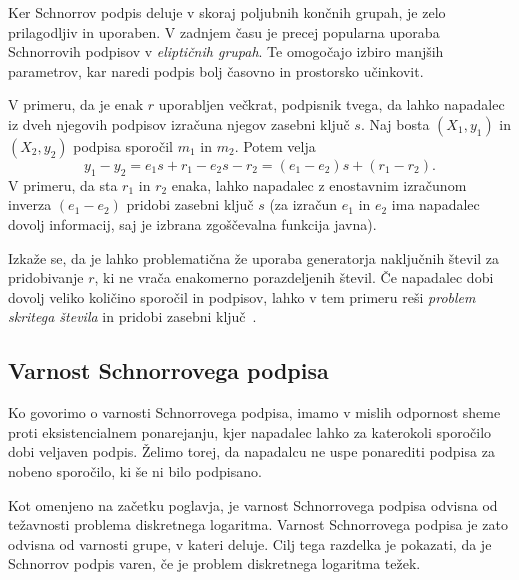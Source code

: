 Ker Schnorrov podpis deluje v skoraj poljubnih končnih grupah, je zelo prilagodljiv in uporaben.
V zadnjem času je precej popularna uporaba Schnorrovih podpisov v \textit{eliptičnih grupah}.
Te omogočajo izbiro manjših parametrov, kar naredi podpis bolj časovno in prostorsko učinkovit.

\begin{opomba}
\label{opomba:nonce}
    V primeru, da je enak $r$ uporabljen večkrat, podpisnik tvega, da lahko napadalec iz dveh njegovih
    podpisov izračuna njegov zasebni ključ $s$. Naj bosta $(X_1, y_1)$ in $(X_2, y_2)$ podpisa sporočil
    $m_1$ in $m_2$. Potem velja
    $$
    y_1 - y_2 = e_1 s + r_1 - e_2 s - r_2 = (e_1 - e_2)s + (r_1 - r_2).
    $$
    V primeru, da sta $r_1$ in $r_2$ enaka, lahko napadalec z enostavnim izračunom inverza $(e_1 - e_2)$
    pridobi zasebni ključ $s$ (za izračun $e_1$ in $e_2$ ima napadalec dovolj informacij, saj je
    izbrana zgoščevalna funkcija javna).

    Izkaže se, da je lahko problematična že uporaba generatorja naključnih števil za pridobivanje
    $r$, ki ne vrača enakomerno porazdeljenih števil. Če napadalec dobi dovolj veliko količino
    sporočil in podpisov, lahko v tem primeru reši \textit{problem skritega števila} in pridobi
    zasebni ključ~\cite{tibouchi2017attacks}.
\end{opomba}

\subsection{Varnost Schnorrovega podpisa}
\label{sec:schnorr-sec}
Ko govorimo o varnosti Schnorrovega podpisa, imamo v mislih odpornost sheme proti eksistencialnem
ponarejanju, kjer napadalec lahko za katerokoli sporočilo dobi veljaven podpis. Želimo torej, da
napadalcu ne uspe ponarediti podpisa za nobeno sporočilo, ki še ni bilo podpisano.

Kot omenjeno na začetku poglavja, je varnost Schnorrovega podpisa odvisna od težavnosti problema
diskretnega logaritma. Varnost Schnorrovega podpisa je zato odvisna od varnosti grupe, v kateri deluje.
Cilj tega razdelka je pokazati, da je Schnorrov podpis varen, če je problem diskretnega logaritma
težek.

